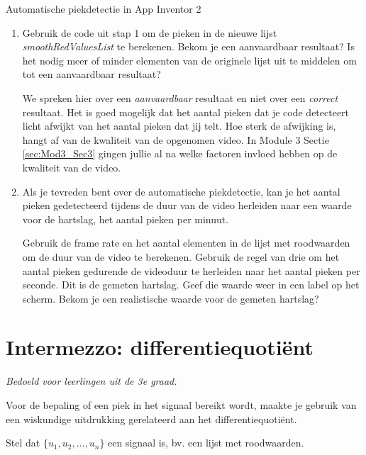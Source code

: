 \begin{opdracht}{Automatische piekdetectie in App Inventor 2}
\begin{enumerate}
	\item Gebruik de code uit stap 1 om de pieken in de nieuwe lijst \emph{smoothRedValuesList} te berekenen. Bekom je een aanvaardbaar resultaat? Is het nodig meer of minder elementen van de originele lijst uit te middelen om tot een aanvaardbaar resultaat?
	
	\begin{opmerking}
	We spreken hier over een \emph{aanvaardbaar} resultaat en niet over een \emph{correct} resultaat. Het is goed mogelijk dat het aantal pieken dat je code detecteert licht afwijkt van het aantal pieken dat jij telt. Hoe sterk de afwijking is, hangt af van de kwaliteit van de opgenomen video. In Module 3 Sectie \ref{sec:Mod3_Sec3} gingen jullie al na welke factoren invloed hebben op de kwaliteit van de video.
	\end{opmerking}

	\item Als je tevreden bent over de automatische piekdetectie, kan je het aantal pieken gedetecteerd tijdens de duur van de video herleiden naar een waarde voor de hartslag, het aantal pieken per minuut.
	
	Gebruik de frame rate en het aantal elementen in de lijst met roodwaarden om de duur van de video te berekenen. Gebruik de regel van drie om het aantal pieken gedurende de videoduur te herleiden naar het aantal pieken per seconde. Dit is de gemeten hartslag. Geef die waarde weer in een label op het scherm. Bekom je een realistische waarde voor de gemeten hartslag?
\end{enumerate}
\end{opdracht}

\section{Intermezzo: differentiequoti\"ent}
\label{sec:Mod4_Sec2}
%
\emph{Bedoeld voor leerlingen uit de 3e graad.}

Voor de bepaling of een piek in het signaal bereikt wordt, maakte je gebruik van een wiskundige uitdrukking gerelateerd aan het differentiequoti\"ent.

Stel dat $\{ u_1, u_2, \ldots, u_n\}$ een signaal is, bv. een lijst met roodwaarden. 

